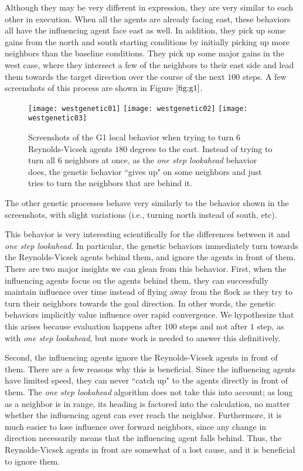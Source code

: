 Although they may be very different in expression, they are very similar to each
other in execution.
When all the agents are already facing east, these behaviors all have the
influencing agent face east as well.
In addition, they pick up some gains from the north and south starting conditions
by initially picking up more neighbors than the baseline conditions.
They pick up some major gains in the west case, where they intersect a few of
the neighbors to their east side and lead them towards the target direction
over the course of the next $100$ steps.
A few screenshots of this process are shown in Figure $\ref{fig:g1}$.
\begin{figure}
    \centering
    \texttt{[image: westgenetic01]}
    \texttt{[image: westgenetic02]}
    \texttt{[image: westgenetic03]}
    \caption{Screenshots of the G1 local behavior when trying to turn $6$
    Reynolds-Vicsek agents $180$ degrees to the east.
    Instead of trying to turn all $6$ neighbors at once, as the \textit{one step
    lookahead} behavior does, the genetic behavior ``gives up" on some neighbors
    and just tries to turn the neighbors that are behind it.}
    \label{fig:g1}
\end{figure}
The other genetic processes behave very similarly to the behavior shown in the
screenshots, with slight variations (i.e., turning north instead of south, etc).

This behavior is very interesting scientifically for the differences between it
and \textit{one step lookahead}.
In particular, the genetic behaviors immediately turn towards the Reynolds-Vicsek
agents behind them, and ignore the agents in front of them.
There are two major insights we can glean from this behavior.
First, when the influencing agents focus on the agents behind them, they can
successfully maintain influence over time instead of flying away from the flock
as they try to turn their neighbors towards the goal direction.
In other words, the genetic behaviors implicitly value influence over rapid
convergence.
We hypothesize that this arises because evaluation happens after $100$ steps and
not after $1$ step, as with \textit{one step lookahead}, but more work is
needed to answer this definitively.

Second, the influencing agents ignore the Reynolds-Vicsek agents in front of
them.
There are a few reasons why this is beneficial.
Since the influencing agents have limited speed, they can never ``catch
up" to the agents directly in front of them.
The \textit{one step lookahead} algorithm does not take this into account;
as long as a neighbor is in range, its heading is factored into the calculation,
no matter whether the influencing agent can ever reach the neighbor.
Furthermore, it is much easier to lose influence over forward neighbors, since
any change in direction necessarily means that the influencing agent falls
behind.
Thus, the Reynolds-Vicsek agents in front are somewhat of a lost cause, and it
is beneficial to ignore them.

